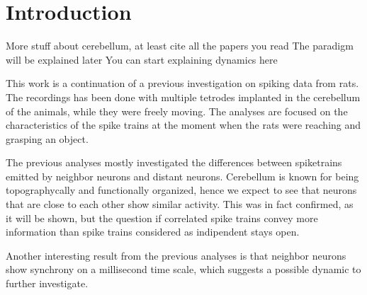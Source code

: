 \section{Introduction}

More stuff about cerebellum, at least cite all the papers you read
The paradigm will be explained later
You can start explaining dynamics here

This work is a continuation of a previous investigation on spiking data from rats. The recordings has been done with multiple tetrodes implanted in the cerebellum of the animals, while they were freely moving. The analyses are focused on the characteristics of the spike trains at the moment when the rats were reaching and grasping an object. 

The previous analyses mostly investigated the differences between spiketrains emitted by neighbor neurons and distant neurons. Cerebellum is known for being topographycally and functionally organized, hence we expect to see that neurons that are close to each other show similar activity. This was in fact confirmed, as it will be shown, but the question if correlated spike trains convey more information than spike trains considered as indipendent stays open.

Another interesting result from the previous analyses is that neighbor neurons show synchrony on a millisecond time scale, which suggests a possible dynamic to further investigate.

